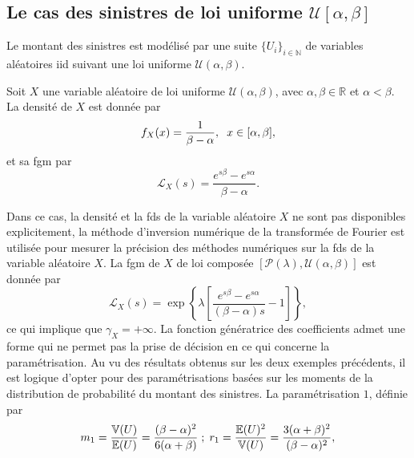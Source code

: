 \subsection{Le cas des sinistres de loi uniforme $\mathcal{U}\left[\alpha,\beta\right]$}
Le montant des sinistres est modélisé par une suite $\{U_{i}\}_{i\in\mathbb{N}}$ de variables aléatoires \gls{iid} suivant une loi uniforme $\mathcal{U}(\alpha,\beta)$. 
\begin{Def}
Soit $X$ une variable aléatoire de loi uniforme $\mathcal{U}(\alpha,\beta)$, avec $\alpha,\beta\in\mathbb{R}$ et $\alpha<\beta$. La densité de $X$ est donnée par 
\begin{equation}\label{DensityUniform}
f_{X}(x)=\frac{1}{\beta-\alpha},\hspace{0.2cm}x\in[\alpha,\beta],
\end{equation}
et sa \gls{fgm} par 
\begin{equation}\label{fgmPhaseType}
\mathcal{L}_{X}(s)=\frac{e^{s\beta}-e^{s\alpha}}{\beta-\alpha}.
\end{equation}
\end{Def}
Dans ce cas, la densité et la \gls{fds} de la variable aléatoire $X$ ne sont pas disponibles explicitement, la méthode d\rq{}inversion numérique de la transformée de Fourier est utilisée pour mesurer la précision des méthodes numériques sur la \gls{fds} de la variable aléatoire $X$. La \gls{fgm} de $X$ de loi composée $\left[\mathcal{P}(\lambda),\mathcal{U}(\alpha,\beta)\right]$ est donnée par 
\begin{equation}\label{fgmCompoundPoissonUniform}
\mathcal{L}_{X}(s)=\exp\left\{\lambda\left[\frac{e^{s\beta}-e^{s\alpha}}{(\beta-\alpha)s}-1\right]\right\},
\end{equation}
ce qui implique que $\gamma_{X}=+\infty$. La fonction génératrice des coefficients admet une forme qui ne permet pas la prise de décision en ce qui concerne la paramétrisation. Au vu des résultats obtenus sur les deux exemples précédents, il est logique d\rq{}opter pour des paramétrisations basées sur les moments de la distribution de probabilité du montant des sinistres. La paramétrisation $1$, définie par 
\begin{equation}\label{CompoundPoissonUniformParametrization1}
m_{1}=\frac{\mathbb{V}(U)}{\mathbb{E}(U)}=\frac{(\beta-\alpha)^{2}}{6(\alpha+\beta)}\hspace{0.1cm};\hspace{0.1cm}r_{1}=\frac{\mathbb{E}(U)^{2}}{\mathbb{V}(U)}=\frac{3(\alpha+\beta)^{2}}{(\beta-\alpha)^{2}},
\end{equation}
